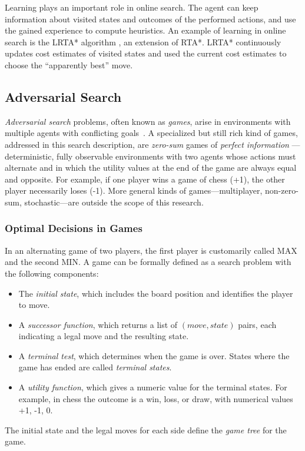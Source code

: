 Learning plays an important role in online search. The agent can keep
information about visited states and outcomes of the performed
actions, and use the gained experience to compute heuristics. An
example of learning in online search is the LRTA* algorithm
\cite{Korf.rta}, an extension of RTA*. LRTA* continuously
updates cost estimates of visited states and used the current cost
estimates to choose the ``apparently best'' move.

\subsection{Adversarial Search}

{\em Adversarial search} problems, often known as {\em games}, arise
in environments with multiple agents with conflicting
goals~\cite{Russell.aima}. A specialized but still rich kind of games,
addressed in this search description, are {\em zero-sum} games of {\em
  perfect information} --- deterministic, fully observable
environments with two agents whose actions must alternate and in which
the utility values at the end of the game are always equal and
opposite. For example, if one player wins a game of chess (+1), the
other player necessarily loses (-1).  More general kinds of
games---multiplayer, non-zero-sum, stochastic---are outside the scope of
this research.

\subsubsection{Optimal Decisions in Games}

In an alternating game of two players, the first player is customarily
called MAX and the second MIN. A game can be formally defined as a
search problem with the following components:
\begin{itemize}
\item The {\em initial state}, which includes the board position and
  identifies the player to move.
\item A {\em successor function}, which returns a list of $(move,
  state)$ pairs, each indicating a legal move and the resulting state.
\item A {\em terminal test}, which determines when the game is
  over. States where the game has ended are called {\em terminal
    states}.
\item A {\em utility function}, which gives a numeric value for the
  terminal states. For example, in chess the outcome is a win, loss,
  or draw, with numerical values +1, -1, 0.
\end{itemize}
The initial state and the legal moves for each side define the {\em
  game tree} for the game.

